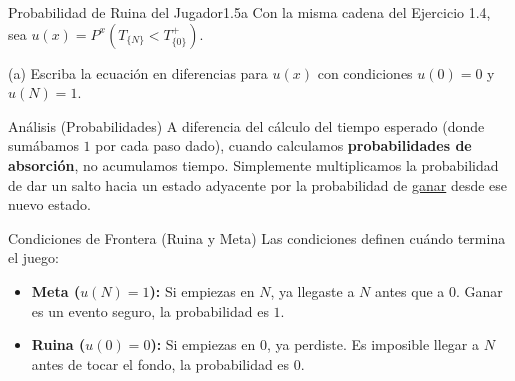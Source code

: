 \documentclass[10pt,a4paper]{article}
\begin{document}
\begin{ejercicio}{Probabilidad de Ruina del Jugador}{1.5a}
    Con la misma cadena del Ejercicio 1.4, sea $u(x) = P^x(T_{\{N\}} < T^+_{\{0\}})$.
\end{ejercicio}

(a) Escriba la ecuación en diferencias para $u(x)$ con condiciones $u(0) = 0$ y $u(N) = 1$.

\vspace{2mm}

\begin{nota}{Análisis (Probabilidades)}
    A diferencia del cálculo del tiempo esperado (donde sumábamos $1$ por cada paso dado), 
    cuando calculamos \textbf{probabilidades de absorción}, no acumulamos tiempo. 
    Simplemente multiplicamos la probabilidad de dar un salto hacia un estado adyacente por 
    la probabilidad de \ul{ganar} desde ese nuevo estado.
\end{nota}

\begin{alerta}{Condiciones de Frontera (Ruina y Meta)}
    Las condiciones definen cuándo termina el juego:
    \begin{itemize}
        \item \textbf{Meta ($u(N) = 1$):} Si empiezas en $N$, ya llegaste a $N$ antes que a $0$. Ganar es un evento seguro, la probabilidad es $1$.
        \item \textbf{Ruina ($u(0) = 0$):} Si empiezas en $0$, ya perdiste. Es imposible llegar a $N$ antes de tocar el fondo, la probabilidad es $0$.
    \end{itemize}
\end{alerta}

\vspace{5mm}
\end{document}
